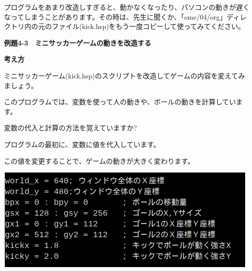 \documentclass[a4paper,dvipdfmx]{jarticle}
\newcommand\textstyleqwerty[1]{#1}
\begin{document}
プログラムをあまり改造しすぎると、動かなくなったり、パソコンの動きが遅くなってしまうことがあります。その時は、先生に聞くか、「ome/04/org」ディレクトリ内の元のファイル(kick.hsp)をもう一度コピーして使ってみてください。


\bigskip


\bigskip


\bigskip


\bigskip


\bigskip

\textstyleqwerty{\textbf{例題4-3　ミニサッカーゲームの動きを改造する}}


\bigskip

{\bfseries
考え方}


\bigskip

ミニサッカーゲーム(kick.hsp)のスクリプトを改造してゲームの内容を変えてみましょう。

このプログラムでは、変数を使って人の動きや、ボールの動きを計算しています。

変数の代入と計算の方法を覚えていますか?


\bigskip

プログラムの最初に、変数に値を代入しています。

この値を変更することで、ゲームの動きが大きく変わります。


\bigskip



\begin{center}
\includegraphics[width=13.044cm,height=5.106cm]{text04-img/text04-img010.png}

\end{center}

\bigskip


\bigskip


\bigskip


\bigskip


\bigskip


\bigskip


\bigskip
\end{document}
